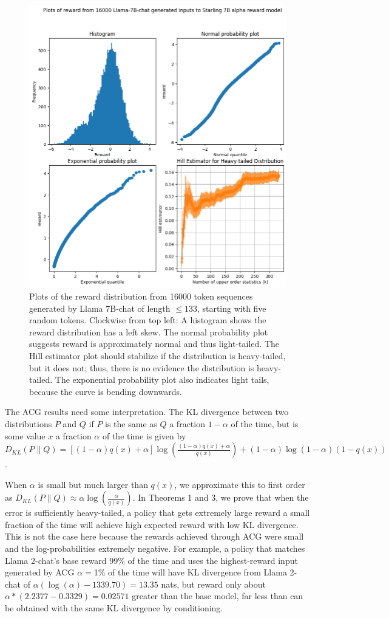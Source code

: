 \documentclass{article}
\begin{document}
\begin{figure}
    \centering
    \includegraphics[width=0.8\linewidth]{images/reward_plots_llama_starling_16k.png}
    \caption{Plots of the reward distribution from 16000 token sequences generated by Llama 7B-chat of length $\le 133$, starting with five random tokens. Clockwise from top left: A histogram shows the reward distribution has a left skew. The normal probability plot suggests reward is approximately normal and thus light-tailed. The Hill estimator plot should stabilize if the distribution is heavy-tailed, but it does not; thus, there is no evidence the distribution is heavy-tailed. The exponential probability plot also indicates light tails, because the curve is bending downwards. }
    \label{fig:starling-llama}
\end{figure}

The ACG results need some interpretation. The KL divergence between two distributions $P$ and $Q$ if $P$ is the same as $Q$ a fraction $1-\alpha$ of the time, but is some value $x$ a fraction $\alpha$ of the time is given by \(D_{KL}(P \| Q) = \left[(1-\alpha)q(x) + \alpha\right] \log \left(\frac{(1-\alpha)q(x) + \alpha}{q(x)}\right) + 
(1-\alpha) \log (1-\alpha) (1 - q(x))\).


When $\alpha$ is small but much larger than $q(x)$, we approximate this to first order as $D_{KL}(P \| Q) \approx \alpha \log \left(\frac{\alpha}{q(x)}\right)$. In Theorems 1 and 3, we prove that when the error is sufficiently heavy-tailed, a policy that gets extremely large reward a small fraction of the time will achieve high expected reward with low KL divergence. This is not the case here because the rewards achieved through ACG were small and the log-probabilities extremely negative. For example, a policy that matches Llama 2-chat's base reward 99\% of the time and uses the highest-reward input generated by ACG $\alpha=$1\% of the time will have KL divergence from Llama 2-chat of $\alpha(\log(\alpha) - 1339.70) = 13.35$ nats, but reward only about $\alpha*(2.2377-0.3329) = 0.02571$ greater than the base model, far less than can be obtained with the same KL divergence by conditioning.
\end{document}
